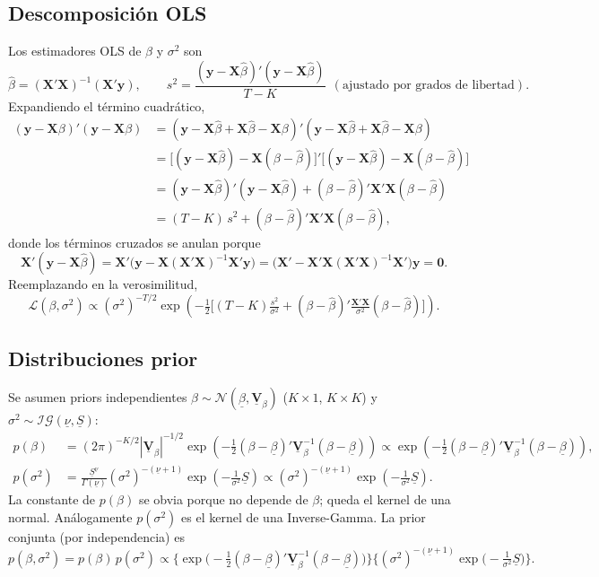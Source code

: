 \documentclass[11pt]{article}
\newcommand{\N}{\mathcal{N}}
\newcommand{\IG}{\mathcal{IG}}
\newcommand{\bX}{\mathbf{X}}
\newcommand{\by}{\mathbf{y}}
\newcommand{\bV}{\mathbf{V}}
\theoremstyle{definition}
\begin{document}
\subsection{Descomposición OLS}
Los estimadores OLS de $\beta$ y $\sigma^2$ son
\[
\hat\beta=(\bX'\bX)^{-1}(\bX'\by),\qquad
s^2=\frac{(\by-\bX\hat\beta)'(\by-\bX\hat\beta)}{T-K}\ \ (\text{ajustado por grados de libertad}).
\]
Expandiendo el término cuadrático,
\begin{align*}
(\by-\bX\beta)'(\by-\bX\beta)
&=(\by-\bX\hat\beta+\bX\hat\beta-\bX\beta)'(\by-\bX\hat\beta+\bX\hat\beta-\bX\beta)\\
&=\big[(\by-\bX\hat\beta)-\bX(\beta-\hat\beta)\big]'\big[(\by-\bX\hat\beta)-\bX(\beta-\hat\beta)\big]\\
&=(\by-\bX\hat\beta)'(\by-\bX\hat\beta)+(\beta-\hat\beta)'\bX'\bX(\beta-\hat\beta)\\
&=(T-K)\,s^2+(\beta-\hat\beta)'\bX'\bX(\beta-\hat\beta),
\end{align*}
donde los términos cruzados se anulan porque
\[
\bX'(\by-\bX\hat\beta)=\bX'\big(\by-\bX(\bX'\bX)^{-1}\bX'\by\big)=\big(\bX'-\bX'\bX(\bX'\bX)^{-1}\bX'\big)\by=\mathbf{0}.
\]
Reemplazando en la verosimilitud,
\[
\mathcal{L}(\beta,\sigma^2)\propto(\sigma^2)^{-T/2}\exp\!\left(-\tfrac12\Big[(T-K)\tfrac{s^2}{\sigma^2}+(\beta-\hat\beta)'\tfrac{\bX'\bX}{\sigma^2}(\beta-\hat\beta)\Big]\right).
\]

\subsection{Distribuciones prior}
Se asumen priors independientes $\beta\sim\N(\underline{\beta},\underline{\bV}_\beta)$ ($K\times1$, $K\times K$) y $\sigma^2\sim\IG(\underline{\nu},\underline{S})$:
\begin{align*}
p(\beta)&=(2\pi)^{-K/2}|\underline{\bV}_\beta|^{-1/2}\exp\!\left(-\tfrac12(\beta-\underline{\beta})'\underline{\bV}_\beta^{-1}(\beta-\underline{\beta})\right)
\propto\exp\!\left(-\tfrac12(\beta-\underline{\beta})'\underline{\bV}_\beta^{-1}(\beta-\underline{\beta})\right),\\[4pt]
p(\sigma^2)&=\frac{\underline{S}^{\underline{\nu}}}{\Gamma(\underline{\nu})}(\sigma^2)^{-(\underline{\nu}+1)}\exp\!\left(-\tfrac{1}{\sigma^2}\underline{S}\right)
\propto(\sigma^2)^{-(\underline{\nu}+1)}\exp\!\left(-\tfrac{1}{\sigma^2}\underline{S}\right).
\end{align*}
La constante de $p(\beta)$ se obvia porque no depende de $\beta$; queda el kernel de una normal. Análogamente $p(\sigma^2)$ es el kernel de una Inverse-Gamma. La prior conjunta (por independencia) es
\[
p(\beta,\sigma^2)=p(\beta)\,p(\sigma^2)
\propto\Big\{\exp\!\big(-\tfrac12(\beta-\underline{\beta})'\underline{\bV}_\beta^{-1}(\beta-\underline{\beta})\big)\Big\}
\Big\{(\sigma^2)^{-(\underline{\nu}+1)}\exp\!\big(-\tfrac{1}{\sigma^2}\underline{S}\big)\Big\}.
\]
\end{document}
